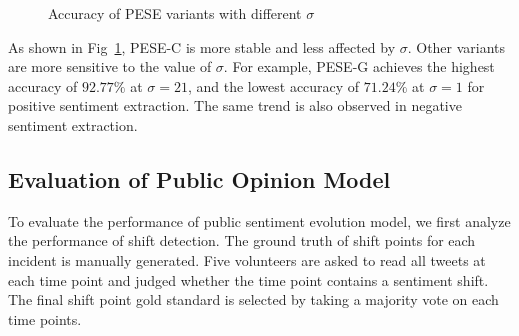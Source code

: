 \documentclass[runningheads]{llncs}
\begin{document}
\vspace{-0.8cm}
\begin{figure}
\centering
{}
\hspace{-4ex}
\setlength{\abovecaptionskip}{-0.1cm}
\caption{Accuracy of PESE variants with different $\sigma$}\label{fig:sigma}
\end{figure}

As shown in Fig~\ref{fig:sigma}, PESE-C is more stable and less affected by $\sigma$. Other variants are more sensitive to the value of $\sigma$. For example, PESE-G achieves the highest accuracy of $92.77\%$ at $\sigma=21$, and the lowest accuracy of $71.24\%$ at $\sigma=1$ for positive sentiment extraction. The same trend is also observed in negative sentiment extraction.


\vspace{-0.4cm}
\subsection{Evaluation of Public Opinion Model}
To evaluate the performance of public sentiment evolution model, we first analyze the performance of shift detection. The ground truth of shift points for each incident is manually generated. Five volunteers are asked to read all tweets at each time point and judged whether the time point contains a sentiment shift. The final shift point gold standard is selected by taking a  majority vote on each time points.
\end{document}
